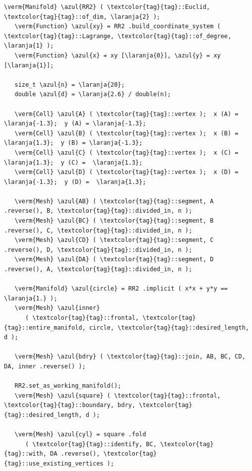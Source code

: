 \begin{Verbatim}[commandchars=\\\{\},formatcom=\small\tt,frame=single,
   label=parag-\ref{\numb section 7.\numb parag 19}.cpp,rulecolor=\color{moldura},
   baselinestretch=0.94,framesep=2mm                                             ]
   \verm{Manifold} \azul{RR2} ( \textcolor{tag}{tag}::Euclid, \textcolor{tag}{tag}::of_dim, \laranja{2} );
   \verm{Function} \azul{xy} = RR2 .build_coordinate_system ( \textcolor{tag}{tag}::Lagrange, \textcolor{tag}{tag}::of_degree, \laranja{1} );
   \verm{Function} \azul{x} = xy [\laranja{0}], \azul{y} = xy [\laranja{1}];

   size_t \azul{n} = \laranja{20};
   double \azul{d} = \laranja{2.6} / double(n);

   \verm{Cell} \azul{A} ( \textcolor{tag}{tag}::vertex );  x (A) = \laranja{-1.3};  y (A) = \laranja{-1.3};
   \verm{Cell} \azul{B} ( \textcolor{tag}{tag}::vertex );  x (B) =  \laranja{1.3};  y (B) = \laranja{-1.3};
   \verm{Cell} \azul{C} ( \textcolor{tag}{tag}::vertex );  x (C) =  \laranja{1.3};  y (C) =  \laranja{1.3};
   \verm{Cell} \azul{D} ( \textcolor{tag}{tag}::vertex );  x (D) = \laranja{-1.3};  y (D) =  \laranja{1.3};

   \verm{Mesh} \azul{AB} ( \textcolor{tag}{tag}::segment, A .reverse(), B, \textcolor{tag}{tag}::divided_in, n );
   \verm{Mesh} \azul{BC} ( \textcolor{tag}{tag}::segment, B .reverse(), C, \textcolor{tag}{tag}::divided_in, n );
   \verm{Mesh} \azul{CD} ( \textcolor{tag}{tag}::segment, C .reverse(), D, \textcolor{tag}{tag}::divided_in, n );
   \verm{Mesh} \azul{DA} ( \textcolor{tag}{tag}::segment, D .reverse(), A, \textcolor{tag}{tag}::divided_in, n );

   \verm{Manifold} \azul{circle} = RR2 .implicit ( x*x + y*y == \laranja{1.} );
   \verm{Mesh} \azul{inner}
      ( \textcolor{tag}{tag}::frontal, \textcolor{tag}{tag}::entire_manifold, circle, \textcolor{tag}{tag}::desired_length, d );

   \verm{Mesh} \azul{bdry} ( \textcolor{tag}{tag}::join, AB, BC, CD, DA, inner .reverse() );

   RR2.set_as_working_manifold();
   \verm{Mesh} \azul{square} ( \textcolor{tag}{tag}::frontal, \textcolor{tag}{tag}::boundary, bdry, \textcolor{tag}{tag}::desired_length, d );

   \verm{Mesh} \azul{cyl} = square .fold
      ( \textcolor{tag}{tag}::identify, BC, \textcolor{tag}{tag}::with, DA .reverse(), \textcolor{tag}{tag}::use_existing_vertices );
\end{Verbatim}

